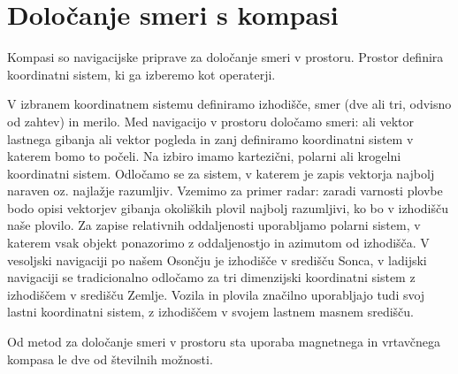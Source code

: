 %
\chapter{Določanje smeri s kompasi}
\label{Ch_Kompasi} %

Kompasi so navigacijske priprave za določanje smeri v prostoru. Prostor definira koordinatni sistem, ki ga izberemo kot operaterji.

V izbranem koordinatnem sistemu definiramo izhodišče, smer (dve ali tri, odvisno od zahtev) in merilo. Med navigacijo v prostoru določamo smeri: ali vektor lastnega gibanja ali vektor pogleda in zanj definiramo koordinatni sistem v katerem bomo to počeli. Na izbiro imamo kartezični, polarni ali krogelni koordinatni sistem. Odločamo se za sistem, v katerem je zapis vektorja najbolj naraven oz. najlažje razumljiv. Vzemimo za primer radar: zaradi varnosti plovbe bodo opisi vektorjev gibanja okoliških plovil  najbolj razumljivi, ko bo v izhodišču naše plovilo. Za zapise relativnih oddaljenosti uporabljamo polarni sistem, v katerem vsak objekt ponazorimo z oddaljenostjo in azimutom od izhodišča. V vesoljski navigaciji po našem Osončju je izhodišče v središču Sonca, v ladijski navigaciji se tradicionalno odločamo za tri dimenzijski koordinatni sistem z izhodiščem v središču Zemlje. Vozila in plovila značilno uporabljajo tudi svoj lastni koordinatni sistem, z izhodiščem v svojem lastnem masnem središču. 

Od metod za določanje smeri v prostoru sta uporaba magnetnega in vrtavčnega kompasa le dve od številnih možnosti.  


